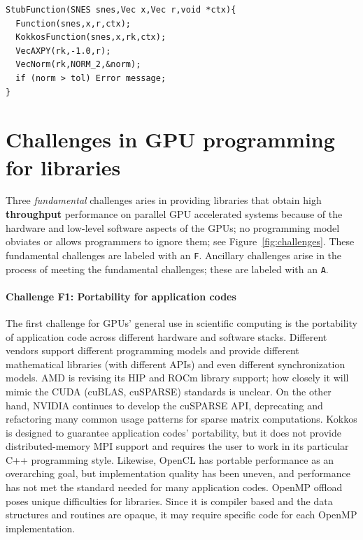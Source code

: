 \documentclass[5p,times]{elsarticle}
\begin{document}
\begin{lstlisting}[caption={Stub routine that runs both implementations},label={lst:stub},frame=single,captionpos=b]
StubFunction(SNES snes,Vec x,Vec r,void *ctx){
  Function(snes,x,r,ctx);
  KokkosFunction(snes,x,rk,ctx);
  VecAXPY(rk,-1.0,r);
  VecNorm(rk,NORM_2,&norm);
  if (norm > tol) Error message;
}
\end{lstlisting}


\section{Challenges in GPU programming for libraries}
\label{sec:challenges}


Three {\em fundamental} challenges aries in providing libraries that obtain high {\bf throughput}  performance on parallel GPU
accelerated systems because of the hardware and low-level software aspects
of the GPUs; no programming model obviates or allows programmers to ignore
them; see Figure~\ref{fig:challenges}. These fundamental challenges are labeled with an {\tt F}. Ancillary challenges arise in the process of
meeting the fundamental challenges; these are labeled with an {\tt A}.


\paragraph{Challenge F1: Portability for application codes}

The first challenge for GPUs' general use in scientific computing is
the portability of application code across different hardware and software stacks. Different vendors support different programming models and provide
different mathematical libraries (with different APIs) and even different
synchronization models. AMD is
revising its HIP and ROCm library support; how closely
it will mimic the CUDA (cuBLAS, cuSPARSE) standards is unclear. On the other hand, NVIDIA
continues to develop the cuSPARSE API, deprecating and refactoring many common usage
patterns for sparse matrix computations.
Kokkos is designed to guarantee application codes' portability, but it does
not provide distributed-memory MPI support and requires the user to work in
its particular C++ programming style. Likewise, OpenCL has portable performance as
an overarching goal, but implementation quality has been uneven, and performance has not met the standard needed for many application codes. OpenMP offload  poses unique difficulties for libraries. Since it is compiler based and the data structures and routines are opaque, it may require specific code for each OpenMP implementation. 
\end{document}
